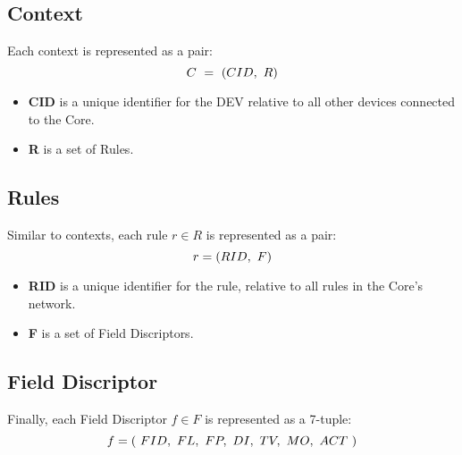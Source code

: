 \documentclass[12pt]{../dalthesis}
\begin{document}
\subsection{Context}
	
	Each context is represented as a pair:
	\begin{equation}\notag
		C \ = \ (CID, \ R)
	\end{equation}

	\begin{itemize}
		\item \textbf{CID} is a unique identifier for the DEV relative to all other devices connected to the Core. 
		\item \textbf{R} is a set of Rules.
	\end{itemize} 

	\vspace{1em}
	\subsection{Rules}
	
	\par{
	Similar to contexts, each rule $r \in R$ is represented as a pair:
	}
	\begin{equation}\notag
		r = (RID, \ F)	
	\end{equation}
	\begin{itemize}
		\item \textbf{RID} is a unique identifier for the rule, relative to all rules in the Core's network.
		\item \textbf{F} is a set of Field Discriptors.
	\end{itemize}

	\vspace{1em}
	\subsection{Field Discriptor}
	Finally, each Field Discriptor $f \in F$ is represented as a 7-tuple:
	\begin{equation}\notag	
		f = (\ FID, \ FL, \ FP, \ DI, \ TV, \ MO, \ ACT \ )
	\end{equation}
\end{document}
